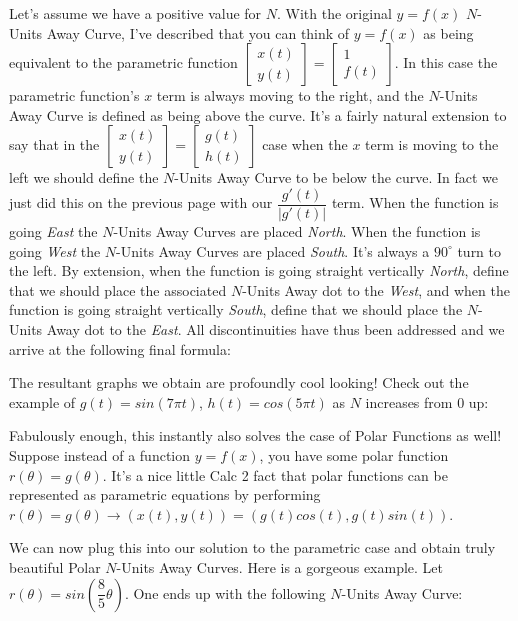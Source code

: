 Let's assume we have a positive value for $N$. With the original $y = f(x)$ $N$-Units Away Curve, I've described that you can think of $y = f(x)$ as being equivalent to the parametric function $
\begin{bmatrix}
  x(t) \\
  y(t)
\end{bmatrix} =
\begin{bmatrix}
  1 \\
  f(t)
\end{bmatrix} $. In this case the parametric function's $x$ term is always moving to the right, and the $N$-Units Away Curve is defined as being above the curve. It's a fairly natural extension to say that in the $
\begin{bmatrix}
  x(t) \\
  y(t)
\end{bmatrix} =
\begin{bmatrix}
  g(t) \\
  h(t)
\end{bmatrix} $ case when the $x$ term is moving to the left we should define the $N$-Units Away Curve to be below the curve. In fact we just did this on the previous page with our $\dfrac{g'(t)}{|g'(t)|}$ term. When the function is going \textit{East} the $N$-Units Away Curves are placed \textit{North}. When the function is going \textit{West} the $N$-Units Away Curves are placed \textit{South}. It's always a $90^{\circ}$ turn to the left. By extension, when the function is going straight vertically \textit{North}, define that we should place the associated $N$-Units Away dot to the \textit{West}, and when the function is going straight vertically \textit{South}, define that we should place the $N$-Units Away dot to the \textit{East}. All discontinuities have thus been addressed and we arrive at the following final formula:

\finalFormula

The resultant graphs we obtain are profoundly cool looking! Check out the example of $g(t) = sin (7 \pi t)$, $h(t) = cos (5 \pi t)$ as $N$ increases from 0 up:

\figuresI

Fabulously enough, this instantly also solves the case of Polar Functions as well! Suppose instead of a function $y = f(x)$, you have some polar function $r(\theta) = g(\theta)$. It’s a nice little Calc 2 fact that polar functions can be represented as parametric equations by performing $r(\theta) = g(\theta) \xrightarrow{} (x(t), y(t)) = (g(t) cos(t), g(t) sin(t))$.

We can now plug this into our solution to the parametric case and obtain truly beautiful Polar $N$-Units Away Curves. Here is a gorgeous example. Let $r(\theta) = sin(\dfrac{8}{5} \theta)$. One ends up with the following $N$-Units Away Curve:

\figuresII
